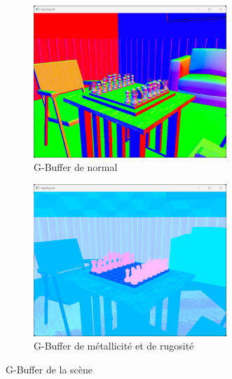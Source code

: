 \begin{figure}[H]
\begin{subfigure}{0.5\textwidth}
            \includegraphics[width=0.8\textwidth]{images/raptiquax_rendering_gbuffer_normal.png}
            \caption{G-Buffer de normal}
            \label{fig:graphics_pipeline_gbuffer_normal}
        \end{subfigure}
        \begin{subfigure}{0.5\textwidth}
            \centering
            \includegraphics[width=0.8\textwidth]{images/raptiquax_rendering_gbuffer_extra.png}
            \caption{G-Buffer de métallicité et de rugosité}
            \label{fig:graphics_pipeline_gbuffer_color}
        \end{subfigure}
        \caption{G-Buffer de la scène}
        \label{fig:graphics_pipeline_gbuffer}
    \end{figure}
